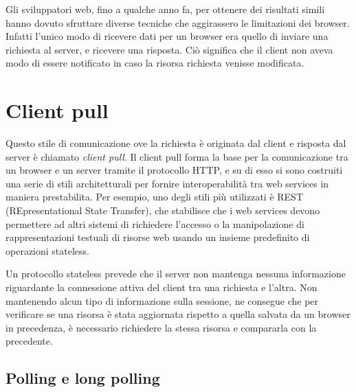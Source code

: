\documentclass[12pt,a4paper,openright,twoside]{report}
\begin{document}
\bigskip

Gli sviluppatori web, fino a qualche anno fa, per ottenere dei risultati simili hanno dovuto sfruttare diverse tecniche che aggirassero le limitazioni dei browser. Infatti l’unico modo di ricevere dati per un browser era quello di inviare una richiesta al server, e ricevere una risposta. Ciò significa che il client non aveva modo di essere notificato in caso la risorsa richiesta venisse modificata.

\section{Client pull}\label{sec_clientpull}

Questo stile di comunicazione ove la richiesta è originata dal client e risposta dal server è chiamato \textit{client pull}. Il client pull forma la base per la comunicazione tra un browser e un server tramite il protocollo HTTP, e su di esso si sono costruiti una serie di stili architetturali per fornire interoperabilità tra web services in maniera prestabilita. Per esempio, uno degli stili più utilizzati è REST (REpresentational State Transfer), che stabilisce che i web services devono permettere ad altri sistemi di richiedere l’accesso o la manipolazione di rappresentazioni testuali di risorse web usando un insieme predefinito di operazioni stateless.

\bigskip

Un protocollo stateless prevede che il server non mantenga nessuna informazione riguardante la connessione attiva del client tra una richiesta e l’altra. Non mantenendo alcun tipo di informazione sulla sessione, ne consegue che per verificare se una risorsa è stata aggiornata rispetto a quella salvata da un browser in precedenza, è necessario richiedere la stessa risorsa e compararla con la precedente.

\subsection{Polling e long polling}
\end{document}

